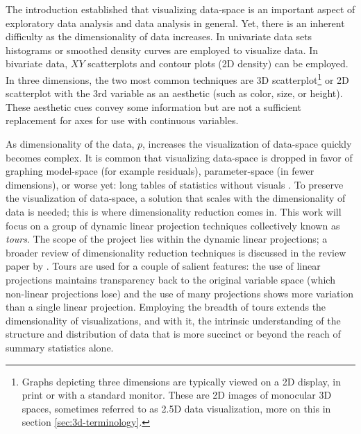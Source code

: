 \documentclass{template/monashthesis}
\begin{document}
The introduction established that visualizing data-space is an important aspect of exploratory data analysis and data analysis in general. Yet, there is an inherent difficulty as the dimensionality of data increases. In univariate data sets histograms or smoothed density curves are employed to visualize data. In bivariate data, \(XY\) scatterplots and contour plots (2D density) can be employed. In three dimensions, the two most common techniques are 3D scatterplot\footnote{Graphs depicting three dimensions are typically viewed on a 2D display, in print or with a standard monitor. These are 2D images of monocular 3D spaces, sometimes referred to as 2.5D data visualization, more on this in section \ref{sec:3d-terminology}.} or 2D scatterplot with the 3rd variable as an aesthetic (such as color, size, or height). These aesthetic cues convey some information but are not a sufficient replacement for axes for use with continuous variables.

As dimensionality of the data, \(p\), increases the visualization of data-space quickly becomes complex. It is common that visualizing data-space is dropped in favor of graphing model-space (for example residuals), parameter-space (in fewer dimensions), or worse yet: long tables of statistics without visuals \autocite{wickham_visualizing_2015}. To preserve the visualization of data-space, a solution that scales with the dimensionality of data is needed; this is where dimensionality reduction comes in. This work will focus on a group of dynamic linear projection techniques collectively known as \emph{tours}. The scope of the project lies within the dynamic linear projections; a broader review of dimensionality reduction techniques is discussed in the review paper by \textcite{grinstein_high-dimensional_2002}. Tours are used for a couple of salient features: the use of linear projections maintains transparency back to the original variable space (which non-linear projections lose) and the use of many projections shows more variation than a single linear projection. Employing the breadth of tours extends the dimensionality of visualizations, and with it, the intrinsic understanding of the structure and distribution of data that is more succinct or beyond the reach of summary statistics alone.
\end{document}
